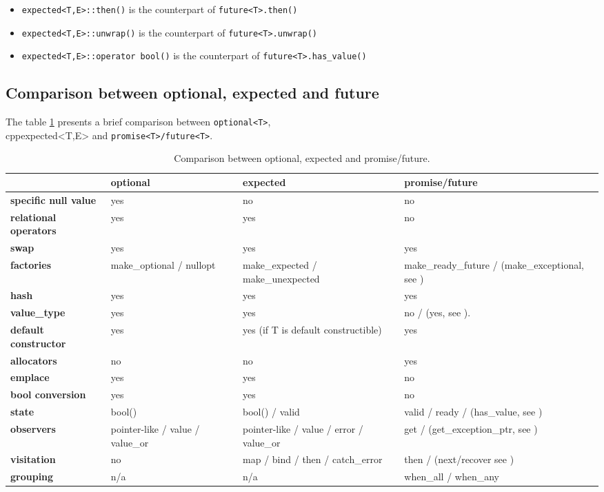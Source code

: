 \documentclass[a4paper,10pt]{article}
\newcommand{\cpp}[1]{\lstinline{#1}}
\begin{document}
\begin{itemize}
 \item \cpp{expected<T,E>::then()} is the counterpart of \cpp{future<T>.then()}
 \item \cpp{expected<T,E>::unwrap()} is the counterpart of \cpp{future<T>.unwrap()}
 \item \cpp{expected<T,E>::operator bool()} is the counterpart of \cpp{future<T>.has_value()}
\end{itemize}

\subsection{Comparison between optional, expected and future}

The table \ref{comp-monads} presents a brief comparison between \cpp{optional<T>}, \\cpp{expected<T,E>}  and \cpp{promise<T>/future<T>}.

\begin{table}
\bgroup
\def\arraystretch{1.5}
\begin{tabular}{|l|>{\raggedright\arraybackslash}p{4cm}|>{\raggedright\arraybackslash}p{4cm}|>{\raggedright\arraybackslash}p{4cm}|}
\hline
                    & \textbf{optional} & \textbf{expected} & \textbf{promise/future} \\
\hline
\textbf{specific null value} & yes & no & no \\
\hline
\textbf{relational operators} & yes & yes & no \\
\hline
\textbf{swap} & yes & yes & yes \\
\hline
\textbf{factories} & make_optional / nullopt & make_expected / make_unexpected & make_ready_future / (make_exceptional, see \cite{MoreAsync}) \\
\hline
\textbf{hash} & yes & yes & yes \\
\hline
\textbf{value_type} & yes & yes & no / (yes, see \cite{MoreAsync}).  \\
\hline
\textbf{default constructor} & yes & yes (if T is default constructible) & yes \\
\hline
\textbf{allocators} & no & no & yes \\
\hline
\textbf{emplace} & yes & yes & no \\
\hline
\textbf{bool conversion} & yes & yes & no \\
\hline
\textbf{state} & bool()  &  bool() / valid & valid / ready / (has_value, see \cite{MoreAsync}) \\
\hline
\textbf{observers} & pointer-like / value / value_or & pointer-like / value / error / value_or & get / (get_exception_ptr, see \cite{MoreAsync}) \\
\hline
\textbf{visitation} & no & map / bind / then / catch_error  & then / (next/recover see \cite{MoreAsync}) \\
\hline
\textbf{grouping} & n/a & n/a & when_all / when_any \\
\hline
\end{tabular}
\egroup
\caption{Comparison between optional, expected and promise/future.}
\label{comp-monads}
\end{table}
\end{document}
